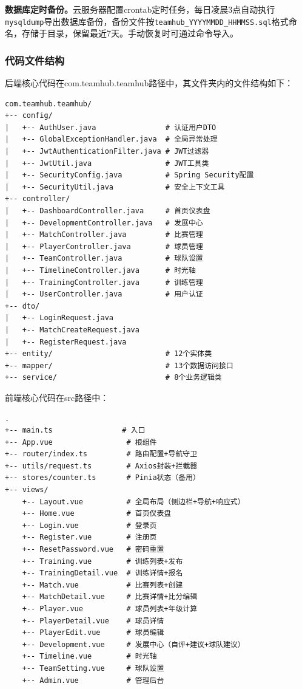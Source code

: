 \documentclass[12pt,a4paper]{ctexart}
\begin{document}
\textbf{数据库定时备份。}云服务器配置crontab定时任务，每日凌晨3点自动执行\texttt{mysqldump}导出数据库备份，备份文件按\texttt{teamhub\_YYYYMMDD\_HHMMSS.sql}格式命名，存储于目录，保留最近7天。手动恢复时可通过命令导入。

\subsubsection{代码文件结构}

后端核心代码在com.teamhub.teamhub路径中，其文件夹内的文件结构如下：

\begin{verbatim}
com.teamhub.teamhub/
+-- config/
|   +-- AuthUser.java                # 认证用户DTO
|   +-- GlobalExceptionHandler.java  # 全局异常处理
|   +-- JwtAuthenticationFilter.java # JWT过滤器
|   +-- JwtUtil.java                 # JWT工具类
|   +-- SecurityConfig.java          # Spring Security配置
|   +-- SecurityUtil.java            # 安全上下文工具
+-- controller/
|   +-- DashboardController.java     # 首页仪表盘
|   +-- DevelopmentController.java   # 发展中心
|   +-- MatchController.java         # 比赛管理
|   +-- PlayerController.java        # 球员管理
|   +-- TeamController.java          # 球队设置
|   +-- TimelineController.java      # 时光轴
|   +-- TrainingController.java      # 训练管理
|   +-- UserController.java          # 用户认证
+-- dto/
|   +-- LoginRequest.java
|   +-- MatchCreateRequest.java
|   +-- RegisterRequest.java
+-- entity/                          # 12个实体类
+-- mapper/                          # 13个数据访问接口
+-- service/                         # 8个业务逻辑类
\end{verbatim}

前端核心代码在src路径中：

\begin{verbatim}
.
+-- main.ts                # 入口
+-- App.vue                 # 根组件
+-- router/index.ts         # 路由配置+导航守卫
+-- utils/request.ts        # Axios封装+拦截器
+-- stores/counter.ts       # Pinia状态（备用）
+-- views/
    +-- Layout.vue          # 全局布局（侧边栏+导航+响应式）
    +-- Home.vue            # 首页仪表盘
    +-- Login.vue           # 登录页
    +-- Register.vue        # 注册页
    +-- ResetPassword.vue   # 密码重置
    +-- Training.vue        # 训练列表+发布
    +-- TrainingDetail.vue  # 训练详情+报名
    +-- Match.vue           # 比赛列表+创建
    +-- MatchDetail.vue     # 比赛详情+比分编辑
    +-- Player.vue          # 球员列表+年级计算
    +-- PlayerDetail.vue    # 球员详情
    +-- PlayerEdit.vue      # 球员编辑
    +-- Development.vue     # 发展中心（自评+建议+球队建议）
    +-- Timeline.vue        # 时光轴
    +-- TeamSetting.vue     # 球队设置
    +-- Admin.vue           # 管理后台
\end{verbatim}
\end{document}
